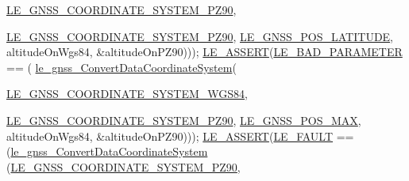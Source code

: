 \begin{DoxyCodeInclude}
{{{{      \hyperlink{le__gnss__interface_8h_a8d401bb325c46681677bd273433565beab88cd62cd5cb91159ea892a8f3444946}{LE\_GNSS\_COORDINATE\_SYSTEM\_PZ90},
                                                         
      \hyperlink{le__gnss__interface_8h_a8d401bb325c46681677bd273433565beab88cd62cd5cb91159ea892a8f3444946}{LE\_GNSS\_COORDINATE\_SYSTEM\_PZ90},
                                                         \hyperlink{le__gnss__interface_8h_afd57bfce3570198fbcf0a98d81dab1c9a92d752c094ebf9bf61a56873e3077a54}{LE\_GNSS\_POS\_LATITUDE},
                                                         altitudeOnWgs84,
                                                         &altitudeOnPZ90)));
    \hyperlink{le__log_8h_ac0dbbef91dc0fed449d0092ff0557b39}{LE\_ASSERT}(\hyperlink{le__basics_8h_a1cca095ed6ebab24b57a636382a6c86cabe505065132f6e8850da6f476d8fb783}{LE\_BAD\_PARAMETER} == (
      \hyperlink{le__gnss__interface_8h_af32fd94e35e4df94b65c84740c5dbf42}{le\_gnss\_ConvertDataCoordinateSystem}(
                                                         
      \hyperlink{le__gnss__interface_8h_a8d401bb325c46681677bd273433565bea6211648c7f9b9c1e99c533d29033a618}{LE\_GNSS\_COORDINATE\_SYSTEM\_WGS84},
                                                         
      \hyperlink{le__gnss__interface_8h_a8d401bb325c46681677bd273433565beab88cd62cd5cb91159ea892a8f3444946}{LE\_GNSS\_COORDINATE\_SYSTEM\_PZ90},
                                                         \hyperlink{le__gnss__interface_8h_afd57bfce3570198fbcf0a98d81dab1c9a0c0c9381e08e3fba69d7751d32e5b609}{LE\_GNSS\_POS\_MAX},
                                                         altitudeOnWgs84,
                                                         &altitudeOnPZ90)));
    \hyperlink{le__log_8h_ac0dbbef91dc0fed449d0092ff0557b39}{LE\_ASSERT}(\hyperlink{le__basics_8h_a1cca095ed6ebab24b57a636382a6c86cac409634423b6b1ef09643529f6224798}{LE\_FAULT} == (\hyperlink{le__gnss__interface_8h_af32fd94e35e4df94b65c84740c5dbf42}{le\_gnss\_ConvertDataCoordinateSystem}
      (\hyperlink{le__gnss__interface_8h_a8d401bb325c46681677bd273433565beab88cd62cd5cb91159ea892a8f3444946}{LE\_GNSS\_COORDINATE\_SYSTEM\_PZ90},
                                                         
}}}}
\end{DoxyCodeInclude}
